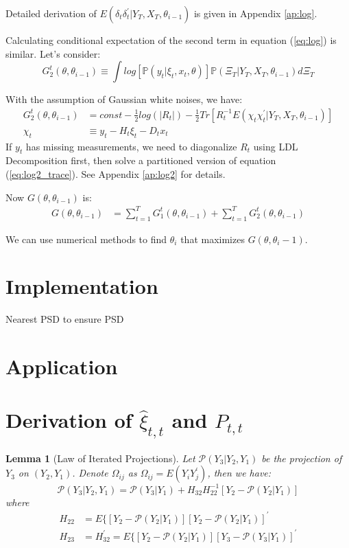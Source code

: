 \documentclass[12pt]{article}
\newtheorem{lemma}{Lemma}
\numberwithin{equation}{section}
\begin{document}
Detailed derivation of $E(\delta_t\delta_t^{'}|Y_T,X_T,\theta_{i-1})$ is given in Appendix \ref{ap:log}. 

Calculating conditional expectation of the second term in equation (\ref{eq:log}) is similar. Let's consider:
\[
    G_2^t(\theta,\theta_{i-1}) \equiv \int log[\mathbb{P}(y_t|\xi_{t},x_t, \theta)]\mathbb{P}(\Xi_T|Y_T,X_T,\theta_{i-1})d\Xi_T 
\]

With the assumption of Gaussian white noises, we have:
\begin{align}
    G_2^t(\theta,\theta_{i-1}) &= const - \frac{1}{2}log(|R_t|)-\frac{1}{2}Tr[R_t^{-1}E(\chi_t\chi_t^{'}|Y_T,X_T,\theta_{i-1})] \label{eq:log2_trace} \\
    \chi_t &\equiv y_t - H_t\xi_t - D_tx_t \nonumber
\end{align}
If $y_t$ has missing measurements, we need to diagonalize $R_t$ using LDL Decomposition first, then solve a partitioned version of equation (\ref{eq:log2_trace}). See Appendix \ref{ap:log2} for details.

Now $G(\theta,\theta_{i-1})$ is:
\begin{align}
    G(\theta,\theta_{i-1}) &= \sum_{t=1}^{T}G_1^t(\theta,\theta_{i-1}) + \sum_{t=1}^{T}G_2^t(\theta,\theta_{i-1}) \label{eq:final_mle}
\end{align}

We can use numerical methods to find $\theta_i$ that maximizes $G(\theta,\theta_i-1)$.
\section{Implementation} \label{sec:implement}
Nearest PSD to ensure PSD
\section{Application} \label{sec:apply}

\printbibliography

\pagebreak
\appendix
\section{Derivation of $\hat{\xi}_{t,t}$ and $P_{t,t}$}

\begin{lemma}[Law of Iterated Projections] \label{lem:1}
    Let $\mathcal{P}(Y_3|Y_2,Y_1)$ be the projection of $Y_3$ on $(Y_2, Y_1)$. Denote $\Omega_{ij}$ as $\Omega_{ij} = E(Y_iY_j^{'})$, then we have:
    \[
        \mathcal{P}(Y_3|Y_2,Y_1) = \mathcal{P}(Y_3|Y_1)+H_{32}H_{22}^{-1}[Y_2 - \mathcal{P}(Y_2|Y_1)]
    \]
    where 
    \begin{align*}
        H_{22} &= E\{[Y_2-\mathcal{P}(Y_2|Y_1)][Y_2-\mathcal{P}(Y_2|Y_1)]^{'} \\
        H_{23} &= H_{32}^{'} = E\{[Y_2-\mathcal{P}(Y_2|Y_1)][Y_3-\mathcal{P}(Y_3|Y_1)]^{'} 
    \end{align*}

\end{lemma}
\end{document}
